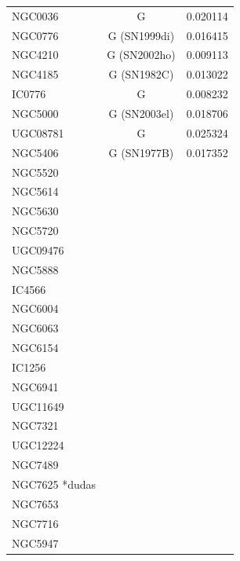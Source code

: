 \documentclass[9pt]{revtex4-1}
\begin{document}
\begin{center}
\begin{tabular}{ l c c }
 NGC0036 & G & 0.020114 \\
 NGC0776 & G (SN1999di) & 0.016415 \\
 NGC4210 & G (SN2002ho) & 0.009113 \\
 NGC4185 & G (SN1982C)  & 0.013022 \\
 IC0776  & G & 0.008232 \\
 NGC5000 & G (SN2003el) & 0.018706 \\
 UGC08781 & G & 0.025324 \\
 NGC5406 & G (SN1977B) & 0.017352 \\
 NGC5520 &  & \\
 NGC5614 &  & \\
 NGC5630 &  & \\
 NGC5720 &  & \\
 UGC09476 &  & \\
 NGC5888 &  & \\
 IC4566 &  & \\
 NGC6004 &  & \\
 NGC6063 &  & \\
 NGC6154 &  & \\
 IC1256 &  & \\
 NGC6941 &  & \\
 UGC11649 &  & \\
 NGC7321 &  & \\
 UGC12224 &  & \\
 NGC7489 &  & \\
 NGC7625 *dudas &  & \\
 NGC7653 &  & \\
 NGC7716 &  & \\
 NGC5947 &  & \\
 
 \end{tabular}
 \end{center}
\end{document}
